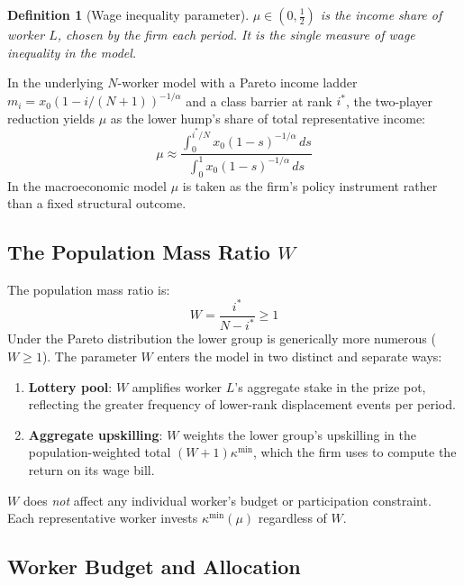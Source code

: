 \documentclass[12pt,a4paper]{article}
\newtheorem{definition}{Definition}
\begin{document}
\begin{definition}[Wage inequality parameter]
$\mu \in (0, \tfrac{1}{2})$ is the income share of worker $L$,
chosen by the firm each period. It is the single measure of wage
inequality in the model.
\end{definition}

In the underlying $N$-worker model with a Pareto income ladder
$m_i = x_0(1 - i/(N+1))^{-1/\alpha}$ and a class barrier at rank
$i^*$, the two-player reduction yields $\mu$ as the lower hump's
share of total representative income:
\begin{equation}
  \mu \approx \frac{\displaystyle\int_0^{i^*/N}
    x_0(1-s)^{-1/\alpha}\,ds}
  {\displaystyle\int_0^{1}
    x_0(1-s)^{-1/\alpha}\,ds}
  \label{eq:mu_micro}
\end{equation}
In the macroeconomic model $\mu$ is taken as the firm's policy
instrument rather than a fixed structural outcome.

\subsection{The Population Mass Ratio $W$}

The population mass ratio is:
\begin{equation}
  W = \frac{i^*}{N - i^*} \geq 1
  \label{eq:W_def}
\end{equation}
Under the Pareto distribution the lower group is generically more
numerous ($W \geq 1$). The parameter $W$ enters the model in two
distinct and separate ways:
\begin{enumerate}
  \item \textbf{Lottery pool}: $W$ amplifies worker $L$'s aggregate
        stake in the prize pot, reflecting the greater frequency of
        lower-rank displacement events per period.
  \item \textbf{Aggregate upskilling}: $W$ weights the lower group's
        upskilling in the population-weighted total $(W+1)\kappa^{\min}$,
        which the firm uses to compute the return on its wage bill.
\end{enumerate}
$W$ does \emph{not} affect any individual worker's budget or
participation constraint. Each representative worker invests
$\kappa^{\min}(\mu)$ regardless of $W$.

\subsection{Worker Budget and Allocation}
\end{document}

